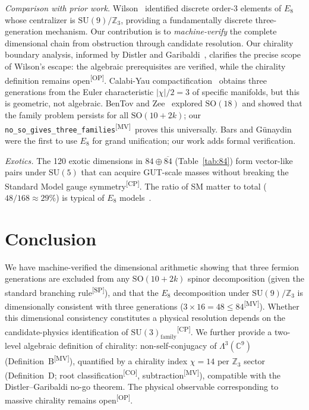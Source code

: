 \documentclass[aps,prl,twocolumn,showpacs,preprintnumbers,superscriptaddress,floatfix]{revtex4-2}
\newcommand{\MV}{\textsuperscript{[MV]}}
\newcommand{\CO}{\textsuperscript{[CO]}}
\newcommand{\CP}{\textsuperscript{[CP]}}
\newcommand{\SP}{\textsuperscript{[SP]}}
\newcommand{\OP}{\textsuperscript{[OP]}}
\begin{document}
\emph{Comparison with prior work.}
Wilson~\cite{wilson2024,wilson2025} identified discrete order-3
elements of $E_8$ whose centralizer is $\mathrm{SU}(9)/\mathbb{Z}_3$,
providing a fundamentally discrete three-generation mechanism.
Our contribution is to \emph{machine-verify} the complete dimensional
chain from obstruction through candidate resolution.
Our chirality boundary analysis, informed by
Distler and Garibaldi~\cite{distler2010}, clarifies the precise
scope of Wilson's escape: the algebraic prerequisites are verified,
while the chirality definition remains open\OP.
Calabi-Yau compactification~\cite{candelas1985} obtains three
generations from the Euler characteristic $|\chi|/2 = 3$ of specific
manifolds, but this is geometric, not algebraic.
BenTov and Zee~\cite{bentov2016} explored $\mathrm{SO}(18)$ and showed
that the family problem persists for all $\mathrm{SO}(10{+}2k)$; our
\texttt{no\_so\_gives\_three\_families}\MV\ proves this universally.
Bars and G\"unaydin~\cite{bars1980} were the first to use $E_8$
for grand unification; our work adds formal verification.

\emph{Exotics.}
The 120 exotic dimensions in $84 \oplus \overline{84}$
(Table~\ref{tab:84}) form vector-like pairs under $\mathrm{SU}(5)$
that can acquire GUT-scale masses without breaking the Standard
Model gauge symmetry\CP.
The ratio of SM matter to total ($48/168 \approx 29\%$) is
typical of $E_8$ models~\cite{lisi2007}.

\section{Conclusion}
\label{sec:conclusion}

We have machine-verified the dimensional arithmetic showing that
three fermion generations are excluded from any
$\mathrm{SO}(10{+}2k)$ spinor decomposition (given the standard
branching rule\SP), and that the $E_8$ decomposition under
$\mathrm{SU}(9)/\mathbb{Z}_3$ is dimensionally consistent with
three generations ($3 \times 16 = 48 \leq 84$\MV).
Whether this dimensional consistency constitutes a physical
resolution depends on the candidate-physics identification of
$\mathrm{SU}(3)_\mathrm{family}$\CP.
We further provide a two-level algebraic definition of chirality:
non-self-conjugacy of $\Lambda^3(\mathbb{C}^9)$ (Definition~B\MV),
quantified by a chirality index $\chi = 14$ per $\mathbb{Z}_3$
sector (Definition~D; root classification\CO, subtraction\MV),
compatible with the Distler--Garibaldi no-go theorem.
The physical observable corresponding to massive
chirality remains open\OP.
\end{document}

